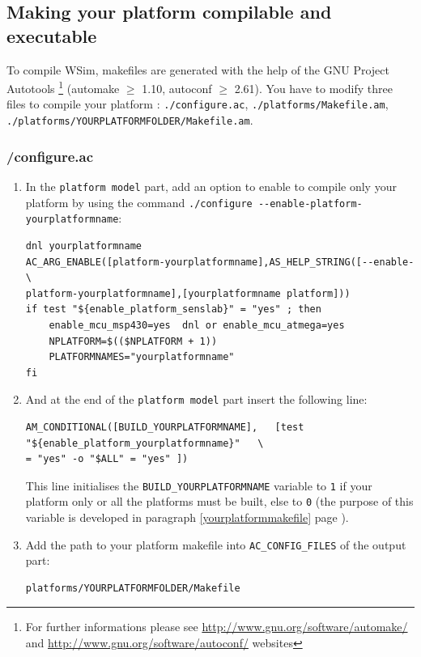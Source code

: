 \documentclass[a4paper,10pt]{report}
\begin{document}
\subsection{Making your platform compilable and executable}
\label{platform-compilation}
To compile WSim, makefiles are generated with the help of the GNU Project Autotools \footnote{For further informations please see \href{http://www.gnu.org/software/automake/}{http://www.gnu.org/software/automake/} and 
\href{http://www.gnu.org/software/autoconf/}{http://www.gnu.org/software/autoconf/} websites} (automake $\ge$ 1.10, autoconf $\ge$ 2.61).
You have to modify three files to compile your platform : \verb$./configure.ac$, \verb$./platforms/Makefile.am$, \verb$./platforms/YOURPLATFORMFOLDER/Makefile.am$.

\subsubsection{/configure.ac}
\begin{enumerate}
  \item In the \verb$platform model$ part, add an option to enable to compile only your platform by using the command \verb$./configure --enable-platform-yourplatformname$:
\begin{verbatim}
dnl yourplatformname
AC_ARG_ENABLE([platform-yourplatformname],AS_HELP_STRING([--enable-\
platform-yourplatformname],[yourplatformname platform]))
if test "${enable_platform_senslab}" = "yes" ; then
	enable_mcu_msp430=yes  dnl or enable_mcu_atmega=yes
	NPLATFORM=$(($NPLATFORM + 1))
	PLATFORMNAMES="yourplatformname"
fi
\end{verbatim}

  \item And at the end of the \verb$platform model$ part insert the following line:
\begin{verbatim}
AM_CONDITIONAL([BUILD_YOURPLATFORMNAME],   [test "${enable_platform_yourplatformname}"   \
= "yes" -o "$ALL" = "yes" ])
\end{verbatim}
This line initialises the \verb$BUILD_YOURPLATFORMNAME$ variable to \verb$1$ if your platform only or all the platforms must be built, else to \verb$0$ (the purpose of this variable is developed in paragraph \ref{yourplatformmakefile} page \pageref{yourplatformmakefile}).\\

  \item Add the path to your platform makefile into \verb$AC_CONFIG_FILES$ of the output part: 
\begin{verbatim}
platforms/YOURPLATFORMFOLDER/Makefile
\end{verbatim}
\end{enumerate}
\end{document}
